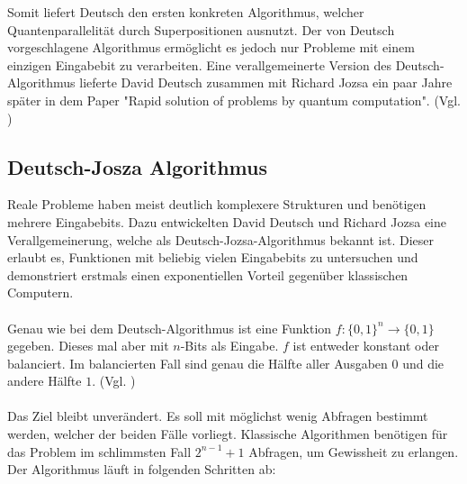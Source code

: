 Somit liefert Deutsch den ersten konkreten Algorithmus, welcher Quantenparallelität durch Superpositionen ausnutzt. Der von Deutsch vorgeschlagene Algorithmus ermöglicht es jedoch nur Probleme mit einem einzigen Eingabebit zu verarbeiten. Eine verallgemeinerte Version des Deutsch-Algorithmus lieferte David Deutsch zusammen mit Richard Jozsa ein paar Jahre später in dem Paper "Rapid solution of problems by quantum computation". (Vgl. \cite[S.33-37]{homeister_quantum_2022})

\subsection{Deutsch-Josza Algorithmus}\label{subsec_jasza}
Reale Probleme haben meist deutlich komplexere Strukturen und benötigen mehrere Eingabebits. Dazu entwickelten David Deutsch und Richard Jozsa eine Verallgemeinerung, welche als Deutsch-Jozsa-Algorithmus bekannt ist. Dieser erlaubt es, Funktionen mit beliebig vielen Eingabebits zu untersuchen und demonstriert erstmals einen exponentiellen Vorteil gegenüber klassischen Computern.\\
\\
Genau wie bei dem Deutsch-Algorithmus ist eine Funktion $f:\{0,1\}^n \rightarrow \{0,1\}$ gegeben. Dieses mal aber mit $n$-Bits als Eingabe. $f$ ist entweder konstant oder balanciert. Im balancierten Fall sind genau die Hälfte aller Ausgaben $0$ und die andere Hälfte $1$. (Vgl. \cite{deutsch_rapid_1992})\\
\\
Das Ziel bleibt unverändert. Es soll mit möglichst wenig Abfragen bestimmt werden, welcher der beiden Fälle vorliegt. Klassische Algorithmen benötigen für das Problem im schlimmsten Fall $2^{n-1}+1$ Abfragen, um Gewissheit zu erlangen. \\

Der Algorithmus läuft in folgenden Schritten ab:

